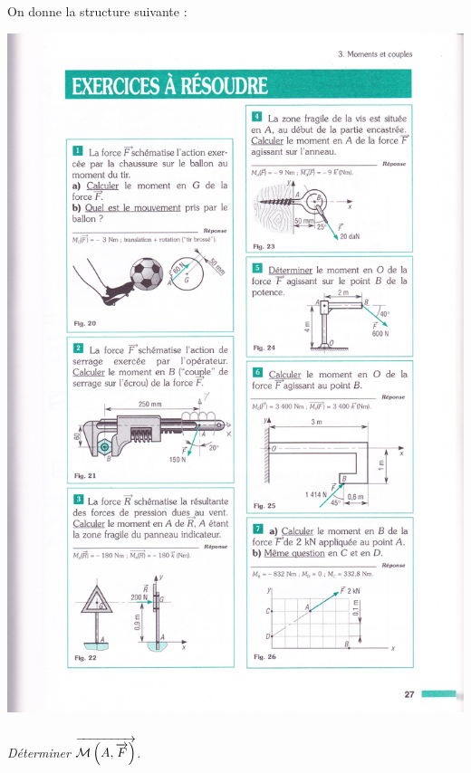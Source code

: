 \documentclass[10pt,fleqn]{book} %
\begin{document}
\begin{multicols}{2}
\setcounter{subparagraph}{0}
On donne la structure suivante : 
\begin{center}
\includegraphics[width=.8\linewidth]{images/fig_02}
\end{center}

\subparagraph{}
\textit{Déterminer $\overrightarrow{\mathcal{M}\left(A,\overrightarrow{F} \right)}$.}




\end{multicols}
\end{document}
